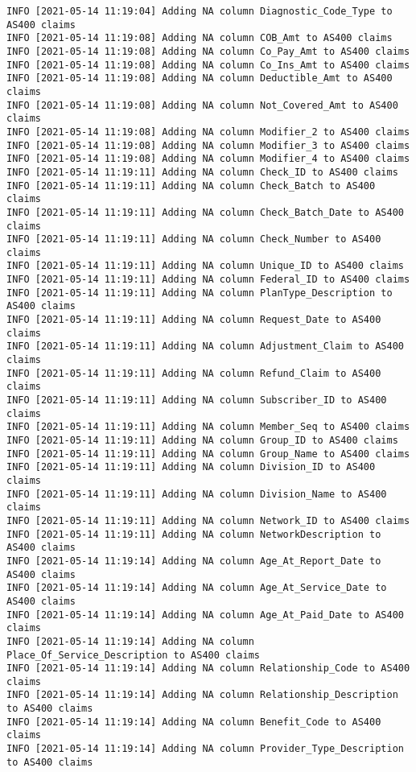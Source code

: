 \documentclass[
]{book}
\begin{document}
\begin{verbatim}
INFO [2021-05-14 11:19:04] Adding NA column Diagnostic_Code_Type to AS400 claims
INFO [2021-05-14 11:19:08] Adding NA column COB_Amt to AS400 claims
INFO [2021-05-14 11:19:08] Adding NA column Co_Pay_Amt to AS400 claims
INFO [2021-05-14 11:19:08] Adding NA column Co_Ins_Amt to AS400 claims
INFO [2021-05-14 11:19:08] Adding NA column Deductible_Amt to AS400 claims
INFO [2021-05-14 11:19:08] Adding NA column Not_Covered_Amt to AS400 claims
INFO [2021-05-14 11:19:08] Adding NA column Modifier_2 to AS400 claims
INFO [2021-05-14 11:19:08] Adding NA column Modifier_3 to AS400 claims
INFO [2021-05-14 11:19:08] Adding NA column Modifier_4 to AS400 claims
INFO [2021-05-14 11:19:11] Adding NA column Check_ID to AS400 claims
INFO [2021-05-14 11:19:11] Adding NA column Check_Batch to AS400 claims
INFO [2021-05-14 11:19:11] Adding NA column Check_Batch_Date to AS400 claims
INFO [2021-05-14 11:19:11] Adding NA column Check_Number to AS400 claims
INFO [2021-05-14 11:19:11] Adding NA column Unique_ID to AS400 claims
INFO [2021-05-14 11:19:11] Adding NA column Federal_ID to AS400 claims
INFO [2021-05-14 11:19:11] Adding NA column PlanType_Description to AS400 claims
INFO [2021-05-14 11:19:11] Adding NA column Request_Date to AS400 claims
INFO [2021-05-14 11:19:11] Adding NA column Adjustment_Claim to AS400 claims
INFO [2021-05-14 11:19:11] Adding NA column Refund_Claim to AS400 claims
INFO [2021-05-14 11:19:11] Adding NA column Subscriber_ID to AS400 claims
INFO [2021-05-14 11:19:11] Adding NA column Member_Seq to AS400 claims
INFO [2021-05-14 11:19:11] Adding NA column Group_ID to AS400 claims
INFO [2021-05-14 11:19:11] Adding NA column Group_Name to AS400 claims
INFO [2021-05-14 11:19:11] Adding NA column Division_ID to AS400 claims
INFO [2021-05-14 11:19:11] Adding NA column Division_Name to AS400 claims
INFO [2021-05-14 11:19:11] Adding NA column Network_ID to AS400 claims
INFO [2021-05-14 11:19:11] Adding NA column NetworkDescription to AS400 claims
INFO [2021-05-14 11:19:14] Adding NA column Age_At_Report_Date to AS400 claims
INFO [2021-05-14 11:19:14] Adding NA column Age_At_Service_Date to AS400 claims
INFO [2021-05-14 11:19:14] Adding NA column Age_At_Paid_Date to AS400 claims
INFO [2021-05-14 11:19:14] Adding NA column Place_Of_Service_Description to AS400 claims
INFO [2021-05-14 11:19:14] Adding NA column Relationship_Code to AS400 claims
INFO [2021-05-14 11:19:14] Adding NA column Relationship_Description to AS400 claims
INFO [2021-05-14 11:19:14] Adding NA column Benefit_Code to AS400 claims
INFO [2021-05-14 11:19:14] Adding NA column Provider_Type_Description to AS400 claims

\end{verbatim}
\end{document}

